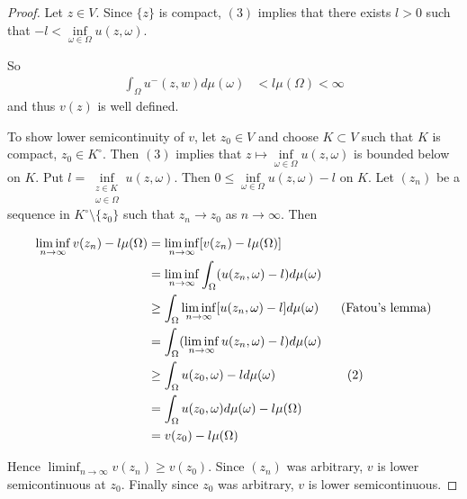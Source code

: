 \documentclass{amsart}
\begin{document}
\begin{proof}

Let $z \in V$. Since $\{z\}$ is compact, $(3)$ implies that there exists $l> 0$ such that $ -l < \inf\limits_{\omega \in \Omega} u(z,\omega)$. 

So 
\begin{align*}
\int_{\Omega}u^{-}(z,w)d\mu(\omega) 
&< l \mu(\Omega) < \infty
\end{align*} and thus $v(z)$ is well defined.

To show lower semicontinuity of $v$, let $z_0 \in V$ and choose $K \subset V$ such that $K$ is compact, $z_0 \in K^{\circ}$. Then $(3)$ implies that $z \mapsto \inf\limits_{\omega \in \Omega}u(z, \omega)$ is bounded below on $K$. Put $l = \inf\limits_{\substack{z \in K\\ \omega \in \Omega}}u(z, \omega)$. Then $0 \leq \inf\limits_{\omega \in \Omega}u(z, \omega) - l$ on $K$. Let $(z_n)$ be a sequence in $K^{\circ}\setminus\{z_0\}$ such that $z_n \rightarrow z_0$ as $n \rightarrow \infty$.
Then 

\begin{align*}
\liminf_{n \rightarrow \infty}v(z_n) - l\mu(\Omega) 
&= \liminf_{n \rightarrow \infty}[v(z_n) - l\mu(\Omega)]\\
&= \liminf_{n \rightarrow \infty}\int_{\Omega}(u(z_n,\omega) - l)d\mu(\omega)\\
&\geq \int_{\Omega}\liminf_{n \rightarrow \infty}[u(z_n,\omega) - l]d\mu(\omega) \hspace{5mm} \text{ (Fatou's lemma)}\\
&= \int_{\Omega}(\liminf_{n \rightarrow \infty}u(z_n,\omega) - l)d\mu(\omega)\\
&\geq \int_{\Omega}u(z_0,\omega) -ld\mu(\omega) \hspace{20mm} (2)\\
&= \int_{\Omega}u(z_0,\omega) d\mu(\omega) - l\mu(\Omega)\\
&= v(z_0) - l\mu(\Omega)
\end{align*}

Hence $\liminf_{n \rightarrow \infty}v(z_n) \geq v(z_0)$. Since $(z_n)$ was arbitrary, $v$ is lower semicontinuous at $z_0$. Finally since $z_0$ was arbitrary, $v$ is lower semicontinuous.


\end{proof}
\end{document}
